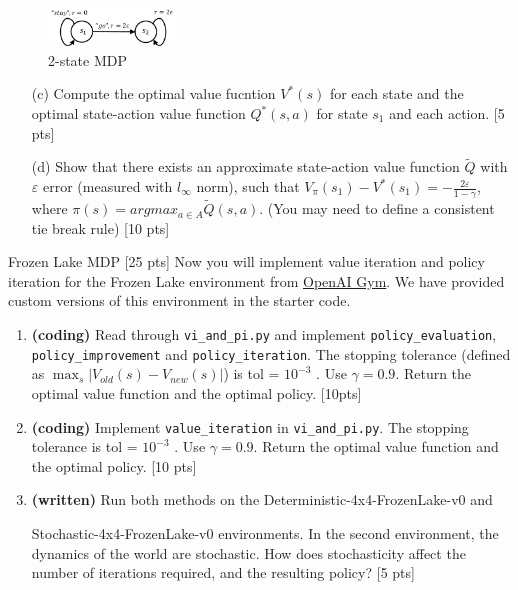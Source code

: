 \documentclass[11pt]{article}
\let\epsilon\varepsilon
\begin{document}
\begin{figure}[h]
  \centering
    \includegraphics[width=0.3\textwidth]{Q3.pdf}
    \caption{2-state MDP}
  	\label{fig:Q3}
\end{figure}
\begin{enumerate}

\item[(c)] Compute the optimal value fucntion $V^*(s)$ for each state and the optimal state-action value function $Q^*(s,a)$ for state $s_1$ and each action. [5 pts]



\item[(d)] Show that there exists an approximate state-action value function $\tilde{Q}$ with $\epsilon$ error (measured with $l_{\infty}$ norm), such that $V_{\pi}(s_1) - V^*(s_1) = - \frac{2\epsilon}{1-\gamma}$, where $\pi(s) = argmax_{a \in A} \tilde{Q}(s,a)$. (You may need to define a consistent tie break rule) [10 pts]


\end{enumerate}

\begin{section}{Frozen Lake MDP [25 pts]}
Now you will implement value iteration and policy iteration for the Frozen Lake environment
from \href{"https://gym.openai.com/envs/FrozenLake-v0"}{OpenAI Gym}. We have provided
custom versions of this environment in the starter code.
\begin{enumerate}[label=(\alph*)]
\item \textbf{(coding)} Read through \texttt{vi\_and\_pi.py} and implement \texttt{policy\_evaluation}, \texttt{policy\_improvement} and \texttt{policy\_iteration}. The stopping tolerance (defined as $\max_s |V_{old}(s) - V_{new}(s)|$) is tol = $10^{-3}$
. Use $\gamma = 0.9$. Return the optimal value function and the optimal policy. [10pts]
\item \textbf{(coding)} Implement \texttt{value\_iteration} in \texttt{vi\_and\_pi.py}. The stopping tolerance is tol =
$10^{-3}$
. Use $\gamma = 0.9$. Return the optimal value function and the optimal policy. [10 pts]
\item \textbf{(written)} Run both methods on the Deterministic-4x4-FrozenLake-v0 and

Stochastic-4x4-FrozenLake-v0 environments. In the second environment, the dynamics of the world are stochastic. How does stochasticity affect the number of iterations required, and the resulting policy? [5 pts]

\end{enumerate}
\end{section}
\end{document}
